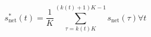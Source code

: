\begin{equation}
	s^{*}_\text{net}(t) = \frac{1}{K}\sum_{\tau=k(t)K}^{(k(t)+1)K-1}s_\text{net}(\tau) \forall t
	\label{ch1:equ:down-sampling-to-half-hourly}
\end{equation}